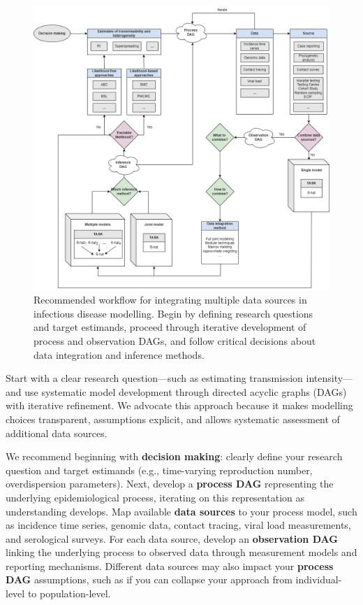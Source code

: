 \documentclass{article}
\begin{document}
\begin{figure}[htbp]
    \centering
    \includegraphics[width=\textwidth]{figures/workflow-schematic.png}
    \caption{Recommended workflow for integrating multiple data sources in infectious disease modelling. Begin by defining research questions and target estimands, proceed through iterative development of process and observation DAGs, and follow critical decisions about data integration and inference methods.}
    \label{fig:workflow}
\end{figure}
Start with a clear research question—such as estimating transmission intensity—and use systematic model development through directed acyclic graphs (DAGs) with iterative refinement.
We advocate this approach because it makes modelling choices transparent, assumptions explicit, and allows systematic assessment of additional data sources.

We recommend beginning with \textbf{decision making}: clearly define your research question and target estimands (e.g., time-varying reproduction number, overdispersion parameters).
Next, develop a \textbf{process DAG} representing the underlying epidemiological process, iterating on this representation as understanding develops.
Map available \textbf{data sources} to your process model, such as incidence time series, genomic data, contact tracing, viral load measurements, and serological surveys.
For each data source, develop an \textbf{observation DAG} linking the underlying process to observed data through measurement models and reporting mechanisms.
Different data sources may also impact your \textbf{process DAG} assumptions, such as if you can collapse your approach from individual-level to population-level.
\end{document}
